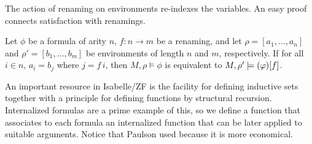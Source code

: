 The action of renaming on environments re-indexes the variables. An
easy proof connects satisfaction with renamings.
\begin{lemma}
  \label{lem:renaming}
  Let $\phi$ be a formula of arity $n$, $f \colon n \to m$ be a
  renaming, and let $\rho=[a_1,\ldots,a_n]$ and
  $\rho'=[b_1,\ldots,b_m]$ be environments of length $n$ and $m$,
  respectively. If for all $i \in n$, $a_i = b_{j}$ where $j=f\,i$,
  then $M,\rho\models \phi$ is equivalent to
  $M,\rho' \models (\varphi)[f]$.
\end{lemma}

An important resource in Isabelle/ZF is the facility for defining
inductive sets \cite{paulson2000fixedpoint,paulson1995set} together
with a principle for defining functions by structural recursion.
Internalized formulas are a prime example of this, so we define
a function  that associates to each formula an internalized
function that can be later applied to suitable arguments. Notice that
Paulson used  because it is more economical.
